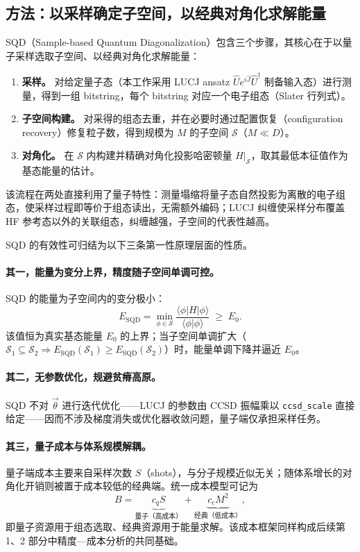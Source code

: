 \documentclass[UTF8,12pt,a4paper]{ctexart}
\begin{document}
\subsection{方法：以采样确定子空间，以经典对角化求解能量}

SQD（Sample-based Quantum Diagonalization）包含三个步骤，其核心在于以量子采样选取子空间、以经典对角化求解能量：

\begin{enumerate}
  \item \textbf{采样。} 对给定量子态（本工作采用 LUCJ ansatz $\hat U e^{i\hat J}\hat U^\dagger$ 制备输入态）进行测量，得到一组 bitstring，每个 bitstring 对应一个电子组态（Slater 行列式）。
  \item \textbf{子空间构建。} 对采得的组态去重，并在必要时通过配置恢复（configuration recovery）修复粒子数，得到规模为 $M$ 的子空间 $\mathcal S$（$M\ll D$）。
  \item \textbf{对角化。} 在 $\mathcal S$ 内构建并精确对角化投影哈密顿量 $H|_{\mathcal S}$，取其最低本征值作为基态能量的估计。
\end{enumerate}

该流程在两处直接利用了量子特性：测量塌缩将量子态自然投影为离散的电子组态，使采样过程即等价于组态读出，无需额外编码；LUCJ 纠缠使采样分布覆盖 HF 参考态以外的关联组态，纠缠越强，子空间的代表性越高。

SQD 的有效性可归结为以下三条第一性原理层面的性质。

\paragraph{其一，能量为变分上界，精度随子空间单调可控。} SQD 的能量为子空间内的变分极小：
\begin{equation}
E_{\text{SQD}} = \min_{\phi\in\mathcal S}\frac{\langle\phi|H|\phi\rangle}{\langle\phi|\phi\rangle} \;\ge\; E_0.
\end{equation}
该值恒为真实基态能量 $E_0$ 的上界；当子空间单调扩大（$\mathcal S_1\subseteq\mathcal S_2\Rightarrow E_{\text{SQD}}(\mathcal S_1)\ge E_{\text{SQD}}(\mathcal S_2)$）时，能量单调下降并逼近 $E_0$。

\paragraph{其二，无参数优化，规避贫瘠高原。} SQD 不对 $\vec\theta$ 进行迭代优化——LUCJ 的参数由 CCSD 振幅乘以 \texttt{ccsd\_scale} 直接给定——因而不涉及梯度消失或优化器收敛问题，量子端仅承担采样任务。

\paragraph{其三，量子成本与体系规模解耦。} 量子端成本主要来自采样次数 $S$（shots），与分子规模近似无关；随体系增长的对角化开销则被置于成本较低的经典端。统一成本模型可记为
\begin{equation}
B=\underbrace{c_q S}_{\text{量子（高成本）}}+\underbrace{c_c M^2}_{\text{经典（低成本）}},
\end{equation}
即量子资源用于组态选取、经典资源用于能量求解。该成本框架同样构成后续第 1、2 部分中精度—成本分析的共同基础。
\end{document}
